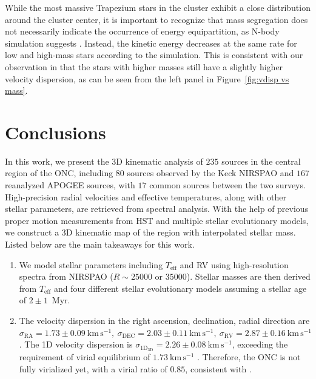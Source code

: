 \documentclass[12pt]{ucsddissertation}
\begin{document}
\begin{CJK*}{UTF8}{gbsn}
While the most massive Trapezium stars in the cluster exhibit a close distribution around the cluster center, it is important to recognize that mass segregation does not necessarily indicate the occurrence of energy equipartition, as N-body simulation suggests \citep[][]{Parker-2016}. Instead, the kinetic energy decreases at the same rate for low and high-mass stars according to the simulation. This is consistent with our observation in that the stars with higher masses still have a slightly higher velocity dispersion, as can be seen from the left panel in Figure~\ref{fig:vdisp vs mass}.



\section{Conclusions}
\label{onc-sec:conclusion}
In this work, we present the 3D kinematic analysis of $235$ sources in the central region of the ONC, including $80$ sources observed by the Keck NIRSPAO and $167$ reanalyzed APOGEE sources, with $17$ common sources between the two surveys. High-precision radial velocities and effective temperatures, along with other stellar parameters, are retrieved from spectral analysis. With the help of previous proper motion measurements from HST and multiple stellar evolutionary models, we construct a 3D kinematic map of the region with interpolated stellar mass. Listed below are the main takeaways for this work.

\begin{enumerate}
    \item We model stellar parameters including $T_\mathrm{eff}$ and RV using high-resolution spectra from NIRSPAO ($R\sim25000$ or $35000$). Stellar masses are then derived from $T_\mathrm{eff}$ and four different stellar evolutionary models assuming a stellar age of $2\pm1$~Myr.

    \item The velocity dispersion in the right ascension, declination, radial direction are $\sigma_\mathrm{RA} = 1.73 \pm 0.09~\mathrm{km}\,\mathrm{s}^{-1},~\sigma_\mathrm{DEC} = 2.03 \pm 0.11~\mathrm{km}\,\mathrm{s}^{-1},~\sigma_\mathrm{RV} = 2.87 \pm 0.16~\mathrm{km}\,\mathrm{s}^{-1}$. The 1D velocity dispersion is $\sigma_\mathrm{1D_{3D}} = 2.26 \pm 0.08~\mathrm{km}\,\mathrm{s}^{-1}$, exceeding the requirement of virial equilibrium of $1.73~\mathrm{km}\,\mathrm{s}^{-1}$ \citep[][]{DaRio-2014}. Therefore, the ONC is not fully virialized yet, with a virial ratio of $0.85$, consistent with \citet{DaRio-2014}.


\end{enumerate}
\end{CJK*}
\end{document}
